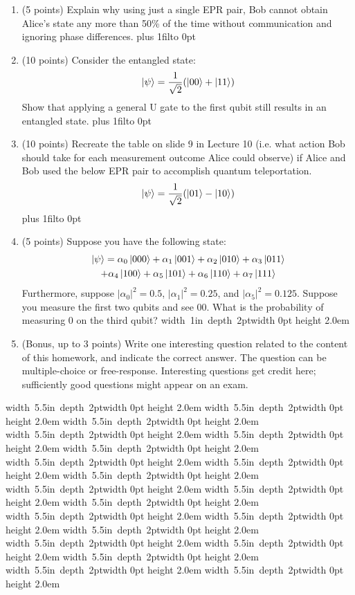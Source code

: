 \documentclass[12pt]{article}
\newcommand{\Blank}{\mbox{\hskip 4pt\vrule width 1in depth 2pt}\vrule width 0pt height 2.0em}
\newcommand{\BlankLine}{\mbox{\hskip 4pt\vrule width 5.5in depth 2pt}\vrule width 0pt height 2.0em}
\def\DefaultSpace{1in}
\newcommand{\LeaveSpace}[1][\DefaultSpace]{%
\vskip #1 plus 1fil\relax\hbox to 0pt{\hss} %
}
\begin{document}
\begin{enumerate}[font=\bfseries]
    \item (5 points) Explain why using just a single EPR pair, Bob cannot obtain Alice's state any more than 50\% of the time without communication and ignoring phase differences. \LeaveSpace{}
    \item (10 points) Consider the entangled state: 
    \[\ket{\psi} = \frac{1}{\sqrt{2}}(\ket{00}+\ket{11})\]
    Show that applying a general U gate to the first qubit still results in an entangled state. \LeaveSpace[2.5in]
    \item (10 points) Recreate the table on slide 9 in Lecture 10 (i.e. what action Bob should take for each measurement outcome Alice could observe) if Alice and Bob used the below EPR pair to accomplish quantum teleportation.
    \[\ket{\psi} = \frac{1}{\sqrt{2}}(\ket{01}-\ket{10})\]
    \LeaveSpace[2.25in]
    \item (5 points) Suppose you have the following state:
    \begin{multline} \ket{\psi} = 
        \alpha_0\ket{000} + \alpha_1\ket{001} +
                    \alpha_2\ket{010} + \alpha_3\ket{011}  \\
                    + \alpha_4\ket{100} + \alpha_5\ket{101} +
                    \alpha_6\ket{110} + \alpha_7\ket{111}
    \end{multline}
    Furthermore, suppose $|\alpha_0|^2 = 0.5$, $|\alpha_1|^2 = 0.25$, and $|\alpha_5|^2 = 0.125$. Suppose you measure the first two qubits and see $00$. What is the probability of measuring 0 on the third qubit? \Blank{}
    \newpage
    \item (Bonus, up to 3 points) Write one interesting question related to the content of this homework, and indicate the correct answer. The question can be multiple-choice or free-response.  Interesting questions get credit here;  sufficiently good questions might appear on an exam.
\end{enumerate}
\newpage
\noindent \BlankLine{}
\BlankLine{}
\BlankLine{}
\BlankLine{}
\BlankLine{}
\BlankLine{}
\BlankLine{}
\BlankLine{}
\BlankLine{}
\BlankLine{}
\BlankLine{}
\BlankLine{}
\BlankLine{}
\BlankLine{}
\BlankLine{}
\BlankLine{}
\BlankLine{}
\BlankLine{}
\BlankLine{}
\BlankLine{}
\end{document}
